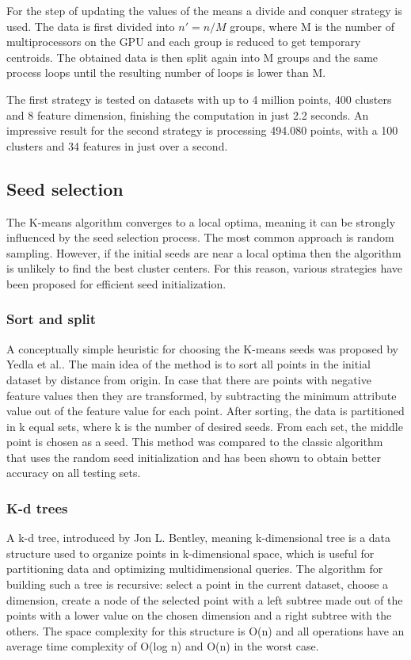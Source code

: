 \documentclass[12pt]{article}
\begin{document}
	For the step of updating the values of the means a divide and conquer strategy is used. The data is first divided into \(n'=n/M\) groups, where M is the number of multiprocessors on the GPU and each group is reduced to get temporary centroids. The obtained data is then split again into M groups and the same process loops until the resulting number of loops is lower than M.
	
	The first strategy is tested on datasets with up to 4 million points, 400 clusters and 8 feature dimension, finishing the computation in just 2.2 seconds. An impressive result for the second strategy is processing 494.080 points, with a 100 clusters and 34 features in just over a second.
	
	\subsection{Seed selection}
	The K-means algorithm converges to a local optima\cite{AlgorithmsForClusteringData}, meaning it can be strongly influenced by the seed selection process. The most common approach is random sampling. However, if the initial seeds are near a local optima then the algorithm is unlikely to find the best cluster centers. For this reason, various strategies have been proposed for efficient seed initialization.
	
	\subsubsection{Sort and split}
	A conceptually simple heuristic for choosing the K-means seeds was proposed by Yedla et al.\cite{SortSeed}. The main idea of the method is to sort all points in the initial dataset by distance from origin. In case that there are points with negative feature values then they are transformed, by subtracting the minimum attribute value out of the feature value for each point. After sorting, the data is partitioned in k equal sets, where k is the number of desired seeds. From each set, the middle point is chosen as a seed. This method was compared to the classic algorithm that uses the random seed initialization and has been shown to obtain better accuracy on all testing sets.
	
	\subsubsection{K-d trees}
	A k-d tree, introduced by Jon L. Bentley\cite{KdTree}, meaning k-dimensional tree is a data structure used to organize points in k-dimensional space, which is useful for partitioning data and optimizing multidimensional queries. The algorithm for building such a tree is recursive: select a point in the current dataset, choose a dimension, create a node of the selected point with a left subtree made out of the points with a lower value on the chosen dimension and a right subtree with the others. The space complexity for this structure is O(n) and all operations have an average time complexity of O(log n) and O(n) in the worst case. 
	
\end{document}
